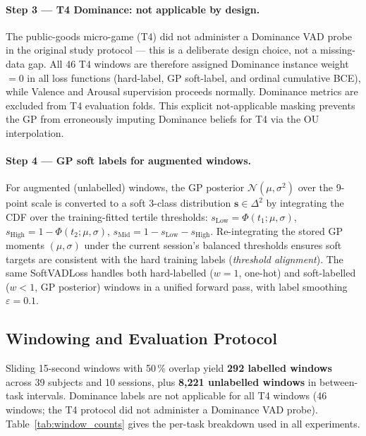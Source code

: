 \documentclass[sigconf,nonacm]{acmart}
\begin{document}
\paragraph{Step 3 --- T4 Dominance: not applicable by design.}
The public-goods micro-game (T4) did not administer a Dominance VAD probe in
the original study protocol --- this is a deliberate design choice, not a
missing-data gap.  All 46 T4 windows are therefore assigned Dominance
instance weight $= 0$ in all loss functions (hard-label, GP soft-label,
and ordinal cumulative BCE), while Valence and Arousal supervision proceeds
normally.  Dominance metrics are excluded from T4 evaluation folds.
This explicit not-applicable masking prevents the GP from erroneously imputing
Dominance beliefs for T4 via the OU interpolation.

\paragraph{Step 4 --- GP soft labels for augmented windows.}
For augmented (unlabelled) windows, the GP posterior $\mathcal{N}(\mu, \sigma^2)$
over the 9-point scale is converted to a soft 3-class distribution
$\mathbf{s} \in \Delta^2$ by integrating the CDF over the training-fitted
tertile thresholds:
$s_{\text{Low}} = \Phi(t_1;\mu,\sigma)$,
$s_{\text{High}} = 1 - \Phi(t_2;\mu,\sigma)$,
$s_{\text{Mid}} = 1 - s_{\text{Low}} - s_{\text{High}}$.
Re-integrating the stored GP moments $(\mu, \sigma)$ under the current
session's balanced thresholds ensures soft targets are
consistent with the hard training labels (\emph{threshold alignment}).
The same SoftVADLoss handles both hard-labelled ($w = 1$, one-hot) and
soft-labelled ($w < 1$, GP posterior) windows in a unified forward pass,
with label smoothing $\varepsilon = 0.1$.

\subsection{Windowing and Evaluation Protocol}
\label{sec:splits}

Sliding 15-second windows with 50\,\% overlap yield \textbf{292 labelled
windows} across 39 subjects and 10 sessions, plus \textbf{8{,}221 unlabelled
windows} in between-task intervals.
Dominance labels are not applicable for all T4 windows (46 windows; the
T4 protocol did not administer a Dominance VAD probe).
Table~\ref{tab:window_counts} gives the per-task breakdown used in all
experiments.
\end{document}
